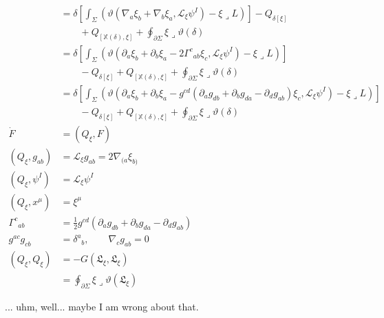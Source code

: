 \[
	\begin{aligned}
		 & =
		\delta
		\left[
			\int_{\Sigma}
			\left(
			\vartheta(
			\nabla_{a}\xi_{b}
			+
			\nabla_{b}\xi_{a},
			\mathcal{L}_{\xi}\psi^{I}
			)
			-
			\xi\mathbin{\lrcorner}L
			\right)
			\right]
		-
		Q_{\delta[\xi]}
		\\
		 & \qquad
		+
		Q_{[\mathbb{X}(\delta),\xi]}
		+
		\oint_{\partial\Sigma}
		\xi\mathbin{\lrcorner}\vartheta(\delta)
		\\[2ex]
		 & =
		\delta
		\left[
			\int_{\Sigma}
			\left(
			\vartheta(
			\partial_{a}\xi_{b}
			+
			\partial_{b}\xi_{a}
			-
			2\Gamma^{c}{}_{ab}\xi_{c},
			\mathcal{L}_{\xi}\psi^{I}
			)
			-
			\xi\mathbin{\lrcorner}L
			\right)
			\right]
		\\
		 & \qquad
		-
		Q_{\delta[\xi]}
		+
		Q_{[\mathbb{X}(\delta),\xi]}
		+
		\oint_{\partial\Sigma}
		\xi\mathbin{\lrcorner}\vartheta(\delta)
		\\[2ex]
		 & =
		\delta
		\left[
		\int_{\Sigma}
		\left(
		\vartheta(
		\partial_{a}\xi_{b}
		+
		\partial_{b}\xi_{a}
		-
		g^{cd}
		(
		\partial_{a}g_{db}
		+
		\partial_{b}g_{da}
		-
		\partial_{d}g_{ab}
		)
		\xi_{c},
		\mathcal{L}_{\xi}\psi^{I}
		)
		-
		\xi\mathbin{\lrcorner}L
		\right)
		\right]
		\\
		 & \qquad
		-
		Q_{\delta[\xi]}
		+
		Q_{[\mathbb{X}(\delta),\xi]}
		+
		\oint_{\partial\Sigma}
		\xi\mathbin{\lrcorner}\vartheta(\delta)
		\\[3ex]
		\dot{F}
		 & =
		(Q_{\xi},F)
		\\[1ex]
		(Q_{\xi},g_{ab})
		 & =
		\mathcal{L}_{\xi}g_{ab}
		=
		2\nabla_{(a}\xi_{b)}
		\\[1ex]
		(Q_{\xi},\psi^{I})
		 & =
		\mathcal{L}_{\xi}\psi^{I}
		\\[1ex]
		(Q_{\xi},x^{\mu})
		 & =
		\xi^{\mu}
		\\[2ex]
		\Gamma^{c}{}_{ab}
		 & =
		\frac{1}{2}
		g^{cd}
		(
		\partial_{a}g_{db}
		+
		\partial_{b}g_{da}
		-
		\partial_{d}g_{ab}
		)
		\\[1ex]
		g^{ac}g_{cb}
		 & =
		\delta^{a}{}_{b},
		\qquad
		\nabla_{c}g_{ab}=0
		\\[2ex]
		(Q_{\xi},Q_{\xi})
		 & =
		-G(\mathfrak{L}_{\xi},\mathfrak{L}_{\xi})
		\\
		 & =
		\oint_{\partial\Sigma}
		\xi\mathbin{\lrcorner}
		\vartheta(\mathfrak{L}_{\xi})
	\end{aligned}
\]

... uhm, well... maybe I am wrong about that.

